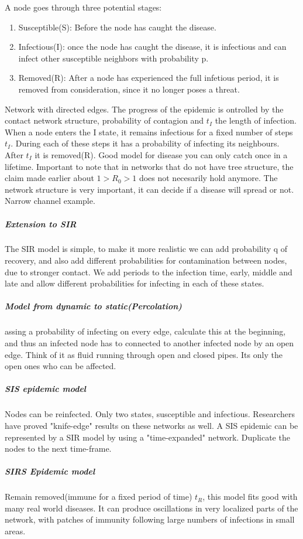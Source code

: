 A node goes through three potential stages: \begin{enumerate}
\item Susceptible(S): Before the node has caught the disease.
\item Infectious(I): once the node has caught the disease, it is infectious and can infect other susceptible neighbors with probability p.
\item Removed(R): After a node has experienced the full infetious period, it is removed from consideration, since it no longer poses a threat.
\end{enumerate}
Network with directed edges. The progress of the epidemic is ontrolled by the contact network
 structure, probability of contagion and $t_{I}$ the length of infection.
When a node enters the I state, it remains infectious for a fixed number of steps $t_{I}$. 
During each of these steps it has a probability of infecting its neighbours. 
After $t_{I}$ it is removed(R). Good model for disease you can only catch once in a lifetime. 
Important to note that in networks that do not have tree structure, the claim made earlier about $1>R_{0}>1$ does not necesarily hold anymore. The network structure is very important, 
it can decide if a disease will spread or not.  Narrow channel example. 
\subparagraph{Extension to SIR}
The SIR model is simple, to make it more realistic we can add probability q of recovery, and also add different probabilities for contamination between nodes, due to stronger contact. We add periods to the infection time, early, middle and late and allow different probabilities for infecting in each of these states. 

\subparagraph{Model from dynamic to static(Percolation)}
assing a probability of infecting on every edge, calculate this at the beginning, and thus an infected
 node has to connected to another infected node by an open edge. Think of it as fluid running through open and closed pipes. Its only the open ones who can be affected. 
 
 \subparagraph{SIS epidemic model}
 Nodes can be reinfected. Only two states, susceptible and infectious. Researchers have proved "knife-edge" results on these networks as well.
 A SIS epidemic can be represented by a SIR model by using a "time-expanded" network. Duplicate the nodes to the next time-frame.
 \subparagraph{SIRS Epidemic model}
 Remain removed(immune for a fixed period of time) $t_{R}$, this model fits good with many real 
 world diseases. It can produce oscillations in  very localized parts of the network, with patches of
  immunity following large numbers of infections in small areas. 

